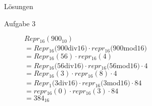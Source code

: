 \begin{frame}{Lösungen}
	\small
	\begin{description}
		\item[Aufgabe 3] $Repr_{16}(900_{10})$\\
		      \pause
		      $=Repr_{16}(900$div$16)\cdot repr_{16}(900$mod$16)$\\
		      \pause
		      $=Repr_{16}(56)\cdot repr_{16}(4)$\\
		      \pause
		      $=Repr_{16}(56$div$16)\cdot repr_{16}(56$mod$16)\cdot 4$\\
		      \pause
		      $=Repr_{16}(3)\cdot repr_{16}(8)\cdot 4$\\
		      \pause
		      $=Repr_{1}(3$div$16)\cdot repr_{16}(3$mod$16)\cdot 84$\\
		      \pause
		      $=repr_{16}(0)\cdot repr_{16}(3)\cdot 84$\\
		      \pause
		      $=384_{16}$\\
	\end{description}
\end{frame}
